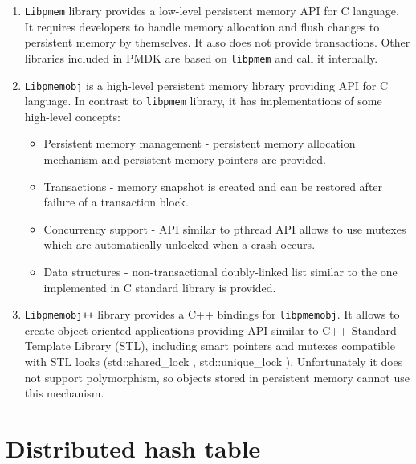     
    \begin{enumerate}
    
    \item
        \texttt{Libpmem} library provides a low-level persistent memory API for C language. 
        It requires developers to handle memory allocation and flush changes to persistent memory by themselves. 
        It also does not provide transactions.
        Other libraries included in PMDK are based on \texttt{libpmem} and call it internally.
    
    \item
        \texttt{Libpmemobj} is a high-level persistent memory library providing API for C language.
        In contrast to \texttt{libpmem} library, it has implementations of some high-level concepts: 
        \begin{itemize}
            \item Persistent memory management - persistent memory allocation mechanism and persistent memory pointers are provided.
            \item Transactions - memory snapshot is created and can be restored after failure of a transaction block.
            \item Concurrency support - API similar to pthread API allows to use mutexes which are automatically unlocked when a crash occurs.
            \item Data structures - non-transactional doubly-linked list similar to the one implemented in C standard library is provided. 
        \end{itemize}
        
    \item
        \texttt{Libpmemobj++} library provides a C++ bindings for \texttt{libpmemobj}.
        It allows to create object-oriented applications providing API similar to C++ Standard Template Library (STL), including smart pointers and mutexes compatible with STL locks (std::shared\_lock \cite{SharedLock}, std::unique\_lock \cite{UniqueLock}).
        Unfortunately it does not support polymorphism, so objects stored in persistent memory cannot use this mechanism.
    \end{enumerate}
\section{Distributed hash table} %


